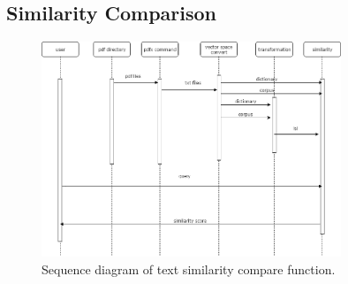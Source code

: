 \subsection{Similarity Comparison}
	\begin{figure}[htb]
		\begin{center}
			\includegraphics[width=0.8\textwidth]{Rainy_Sequence_diagram}
		\end{center}
		\caption{Sequence diagram of text similarity compare function.\label{Sequence diagram}}
	\end{figure}
	\newpage
